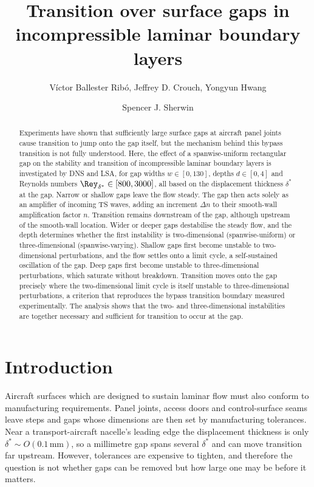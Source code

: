 \documentclass[lineno]{jfm}
\title{Transition over surface gaps in incompressible laminar boundary layers}
\author{Víctor Ballester Ribó\aff{1}, Jeffrey D. Crouch\aff{2}, Yongyun Hwang\aff{1} \and Spencer J. Sherwin\aff{1}}
\affiliation{\aff{1}Department of Aeronautics, Imperial College London, South Kensington, London SW7 2AZ, UK
\aff{2}The Boeing Company, P.O. Box 3707, Seattle, WA 98124-2207, USA}
\newcommand\dstar{{\delta^*}} %
\begin{document}
\LineNumberstrue
\maketitle

\begin{abstract}
	Experiments have shown that sufficiently large surface gaps at aircraft panel joints cause transition to jump onto the gap itself, but the mechanism behind this bypass transition is not fully understood. Here, the effect of a spanwise-uniform rectangular gap on the stability and transition of incompressible laminar boundary layers is investigated by \acl{DNS} and \acl{LSA}, for gap widths $w\in[0,130]$, depths $d\in[0,4]$ and Reynolds numbers $\Rey_\dstar\in[800,3000]$, all based on the displacement thickness $\dstar$ at the gap. Narrow or shallow gaps leave the flow steady. The gap then acts solely as an amplifier of incoming \acl{TS} waves, adding an increment $\Delta n$ to their smooth-wall amplification factor $n$. Transition remains downstream of the gap, although upstream of the smooth-wall location. Wider or deeper gaps destabilise the steady flow, and the depth determines whether the first instability is two-dimensional (spanwise-uniform) or three-dimensional (spanwise-varying). Shallow gaps first become unstable to two-dimensional perturbations, and the flow settles onto a limit cycle, a self-sustained oscillation of the gap. Deep gaps first become unstable to three-dimensional perturbations, which saturate without breakdown. Transition moves onto the gap precisely where the two-dimensional limit cycle is itself unstable to three-dimensional perturbations, a criterion that reproduces the bypass transition boundary measured experimentally. The analysis shows that the two- and three-dimensional instabilities are together necessary and sufficient for transition to occur at the gap.
\end{abstract}

\acresetall

\section{Introduction}\label{sec:introduction}
Aircraft surfaces which are designed to sustain laminar flow must also conform to manufacturing requirements. Panel joints, access doors and control-surface seams leave steps and gaps whose dimensions are then set by manufacturing tolerances. Near a transport-aircraft nacelle's leading edge the displacement thickness is only $\dstar\sim O(0.1\,\mathrm{mm})$, so a millimetre gap spans several $\dstar$ and can move transition far upstream. However, tolerances are expensive to tighten, and therefore the question is not whether gaps can be removed but how large one may be before it matters.
\end{document}
